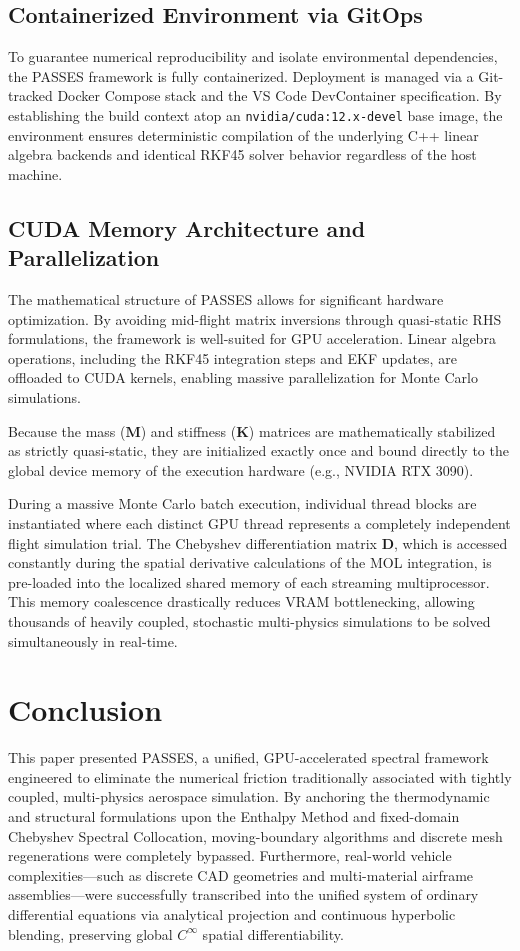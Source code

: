 \documentclass[11pt,a4paper]{article}
\theoremstyle{definition}
\numberwithin{equation}{section}
\begin{document}
\subsection{Containerized Environment via GitOps}
To guarantee numerical reproducibility and isolate environmental dependencies, the PASSES framework is fully containerized. Deployment is managed via a Git-tracked Docker Compose stack and the VS Code DevContainer specification. By establishing the build context atop an \texttt{nvidia/cuda:12.x-devel} base image, the environment ensures deterministic compilation of the underlying C++ linear algebra backends and identical RKF45 solver behavior regardless of the host machine.

\subsection{CUDA Memory Architecture and Parallelization}
The mathematical structure of PASSES allows for significant hardware optimization. By avoiding mid-flight matrix inversions through quasi-static RHS formulations, the framework is well-suited for GPU acceleration. Linear algebra operations, including the RKF45 integration steps and EKF updates, are offloaded to CUDA kernels, enabling massive parallelization for Monte Carlo simulations.

Because the mass ($\mathbf{M}$) and stiffness ($\mathbf{K}$) matrices are mathematically stabilized as strictly quasi-static, they are initialized exactly once and bound directly to the global device memory of the execution hardware (e.g., NVIDIA RTX 3090). 

During a massive Monte Carlo batch execution, individual thread blocks are instantiated where each distinct GPU thread represents a completely independent flight simulation trial. The Chebyshev differentiation matrix $\mathbf{D}$, which is accessed constantly during the spatial derivative calculations of the MOL integration, is pre-loaded into the localized shared memory of each streaming multiprocessor. This memory coalescence drastically reduces VRAM bottlenecking, allowing thousands of heavily coupled, stochastic multi-physics simulations to be solved simultaneously in real-time.

\section{Conclusion}
\label{sec:conclusion}
This paper presented PASSES, a unified, GPU-accelerated spectral framework engineered to eliminate the numerical friction traditionally associated with tightly coupled, multi-physics aerospace simulation. By anchoring the thermodynamic and structural formulations upon the Enthalpy Method and fixed-domain Chebyshev Spectral Collocation, moving-boundary algorithms and discrete mesh regenerations were completely bypassed. Furthermore, real-world vehicle complexities—such as discrete CAD geometries and multi-material airframe assemblies—were successfully transcribed into the unified system of ordinary differential equations via analytical projection and continuous hyperbolic blending, preserving global $C^\infty$ spatial differentiability. 
\end{document}
